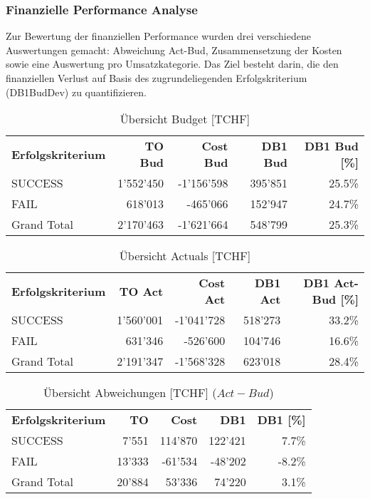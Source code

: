 \subsubsection{Finanzielle Performance Analyse}
Zur Bewertung der finanziellen Performance wurden drei verschiedene Auswertungen gemacht: Abweichung Act-Bud, Zusammensetzung der Kosten sowie eine Auswertung pro Umsatzkategorie. Das Ziel besteht darin, die den finanziellen Verlust auf Basis des zugrundeliegenden Erfolgskriterium (DB1BudDev) zu quantifizieren. 
\begin{table}[htbp]
	\centering
	\caption{Übersicht Budget [TCHF]}
	\begin{tabular}{lrrrr}
		\textbf{Erfolgskriterium} & \textbf{TO Bud} & \textbf{Cost Bud} &
		\textbf{DB1 Bud} & \textbf{DB1 Bud [\%]} \\
	SUCCESS & 1'552'450 & -1'156'598 & 395'851 & 25.5\% \\
	FAIL  & 618'013 & -465'066 & 152'947 & 24.7\% \\
	Grand Total & 2'170'463 & -1'621'664 & 548'799 & 25.3\% \\
	\end{tabular}%
\label{bud}%
\end{table}%
\begin{table}[htbp]
	\centering
	\caption{Übersicht Actuals [TCHF]}
	\begin{tabular}{lrrrr}
		\textbf{Erfolgskriterium} & \textbf{TO Act} & \textbf{Cost Act} & \textbf{DB1 Act}&
		\textbf{DB1 Act-Bud [\%]} \\
			SUCCESS & 1'560'001 & -1'041'728 & 518'273 & 33.2\% \\
			FAIL  & 631'346 & -526'600 & 104'746 & 16.6\% \\
			Grand Total & 2'191'347 & -1'568'328 & 623'018 & 28.4\% \\
	\end{tabular}
\label{act}%
\end{table}%
\begin{table}[H]
\centering
\caption{Übersicht Abweichungen [TCHF] ($Act-Bud$)}
\begin{tabular}{lrrrr}
	\textbf{Erfolgskriterium} & \textbf{TO} & \textbf{Cost} & \textbf{DB1}&
	\textbf{DB1 [\%]} \\
	SUCCESS & 7'551 & 114'870 & 122'421 & 7.7\% \\
	FAIL  & 13'333 & -61'534 & -48'202 & -8.2\% \\
	Grand Total & 20'884 & 53'336 & 74'220 & 3.1\% \\
\end{tabular}
\label{Abw}%
\end{table}%
